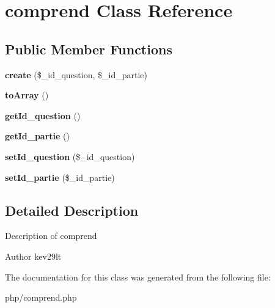 \hypertarget{classcomprend}{}\section{comprend Class Reference}
\label{classcomprend}
\subsection*{Public Member Functions}
\begin{DoxyCompactItemize}
\item 
\mbox{\label{classcomprend_a18fe89173d8439ca7bb650e43b3c8abf}} 
{\bfseries create} (\$\+\_\+id\+\_\+question, \$\+\_\+id\+\_\+partie)
\item 
\mbox{\label{classcomprend_a658defb34762c8f40085aec87e16ba1a}} 
{\bfseries to\+Array} ()
\item 
\mbox{\label{classcomprend_a1fbf0c8124cfe5071f083c38d0494acb}} 
{\bfseries get\+Id\+\_\+question} ()
\item 
\mbox{\label{classcomprend_a3212f8c90b6adb064d0b70929dfeec4a}} 
{\bfseries get\+Id\+\_\+partie} ()
\item 
\mbox{\label{classcomprend_ac24eebef0d2ff0f8671de8c88136c189}} 
{\bfseries set\+Id\+\_\+question} (\$\+\_\+id\+\_\+question)
\item 
\mbox{\label{classcomprend_a1c24bab5533c42a8a90d81053e39f92e}} 
{\bfseries set\+Id\+\_\+partie} (\$\+\_\+id\+\_\+partie)
\end{DoxyCompactItemize}


\subsection{Detailed Description}
Description of comprend

\begin{DoxyAuthor}{Author}
kev29lt 
\end{DoxyAuthor}


The documentation for this class was generated from the following file\+:\begin{DoxyCompactItemize}
\item 
php/comprend.\+php\end{DoxyCompactItemize}
